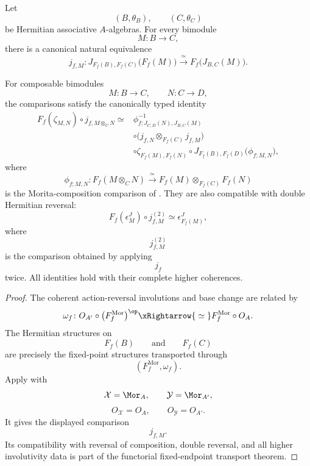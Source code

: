 \begin{proposition}
\label{prop:base-change-hermitian-reversal}
Let
\[
    (B,\theta_B),
    \qquad
    (C,\theta_C)
\]
be Hermitian associative $A$-algebras. For every bimodule
\[
    M
    \colon
    B
    \longrightarrow
    C,
\]
there is a canonical natural equivalence
\[
    j_{f,M}
    \colon
    J_{F_f(B),F_f(C)}
    \bigl(
        F_f(M)
    \bigr)
    \xrightarrow{\;\simeq\;}
    F_f
    \bigl(
        J_{B,C}(M)
    \bigr).
\]

For composable bimodules
\[
    M
    \colon
    B
    \longrightarrow
    C,
    \qquad
    N
    \colon
    C
    \longrightarrow
    D,
\]
the comparisons satisfy the canonically typed identity
\[
\begin{aligned}
    F_f(\zeta_{M,N})
    \circ
    j_{f,M\otimes_CN}
    \simeq{}&
    \phi_{f;J_{C,D}(N),J_{B,C}(M)}^{-1}
    \\
    &\circ
    \bigl(
        j_{f,N}
        \otimes_{F_f(C)}
        j_{f,M}
    \bigr)
    \\
    &\circ
    \zeta_{F_f(M),F_f(N)}
    \circ
    J_{F_f(B),F_f(D)}
    \bigl(
        \phi_{f;M,N}
    \bigr),
\end{aligned}
\]
where
\[
    \phi_{f;M,N}
    \colon
    F_f(M\otimes_CN)
    \xrightarrow{\;\simeq\;}
    F_f(M)
    \otimes_{F_f(C)}
    F_f(N)
\]
is the Morita-composition comparison of
.
They are also compatible with double Hermitian reversal:
\[
    F_f(\epsilon^J_M)
    \circ
    j^{(2)}_{f,M}
    \simeq
    \epsilon^J_{F_f(M)},
\]
where
\[
    j^{(2)}_{f,M}
\]
is the comparison obtained by applying
\[
    j_f
\]
twice. All identities hold with their complete higher coherences.
\end{proposition}

\begin{proof}
The coherent action-reversal involutions and base change are related by
\[
    \omega_f
    \colon
    O_{A'}
    \circ
    \bigl(
        F_f^{\mathrm{Mor}}
    \bigr)^{\op}
    \xRightarrow{\;\simeq\;}
    F_f^{\mathrm{Mor}}
    \circ
    O_A.
\]
The Hermitian structures on
\[
    F_f(B)
    \qquad\text{and}\qquad
    F_f(C)
\]
are precisely the fixed-point structures transported through
\[
    (F_f^{\mathrm{Mor}},\omega_f).
\]
Apply
with
\[
    \mathcal X
    =
    \Mor_A,
    \qquad
    \mathcal Y
    =
    \Mor_{A'},
\]
\[
    O_{\mathcal X}
    =
    O_A,
    \qquad
    O_{\mathcal Y}
    =
    O_{A'}.
\]
It gives the displayed comparison
\[
    j_{f,M}.
\]
Its compatibility with reversal of composition, double reversal, and all
higher involutivity data is part of the functorial fixed-endpoint
transport theorem.
\end{proof}

